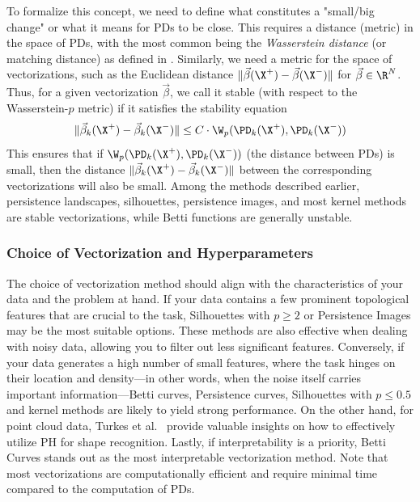 To formalize this concept, we need to define what constitutes a "small/big change" or what it means for PDs to be close. This requires a distance (metric) in the space of PDs, with the most common being the \textit{Wasserstein distance} (or matching distance) as defined in . Similarly, we need a metric for the space of vectorizations, such as the Euclidean distance $\|\vec{\beta}(\X^+) -\vec{\beta}(\X^-)\|$ for $\vec{\beta} \in \R^N$. Thus, for a given vectorization $\vec{\beta}$, we call it stable (with respect to the Wasserstein-$p$ metric) if it satisfies the stability equation
\[ \|\vec{\beta}_k(\X^+) -\vec{\beta}_k(\X^-)\|\leq C \cdot \W_p(\PD_k(\X^+), \PD_k(\X^-)) \]
This ensures that if $\W_p(\PD_k(\X^+), \PD_k(\X^-))$ (the distance between PDs) is small, then the distance $\|\vec{\beta}_k(\X^+) -\vec{\beta}_k(\X^-)\|$ between the corresponding vectorizations will also be small.
Among the methods described earlier, persistence landscapes, silhouettes, persistence images, and most kernel methods are stable vectorizations, while Betti functions are generally unstable.


\subsubsection{Choice of Vectorization and Hyperparameters}  
The choice of vectorization method should align with the characteristics of your data and the problem at hand. If your data contains a few prominent topological features that are crucial to the task, Silhouettes with $p \geq 2$ or Persistence Images may be the most suitable options. These methods are also effective when dealing with noisy data, allowing you to filter out less significant features. Conversely, if your data generates a high number of small features, where the task hinges on their location and density—in other words, when the noise itself carries important information—Betti curves, Persistence curves, Silhouettes with $p\leq 0.5$ and kernel methods are likely to yield strong performance. On the other hand, for point cloud data, Turkes et al.~\cite{turkes2022effectiveness} provide valuable insights on how to effectively utilize PH for shape recognition. Lastly, if interpretability is a priority, Betti Curves stands out as the most interpretable vectorization method. Note that most vectorizations are computationally efficient and require minimal time compared to the computation of PDs.


